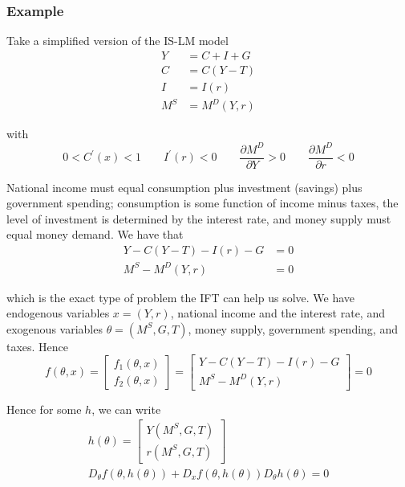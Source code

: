 \documentclass{article}
\begin{document}
\subsubsection{Example}
\label{ssub:example}

Take a simplified version of the IS-LM model
\begin{align*}
  Y   & = C + I + G   \\
  C   & = C(Y - T)    \\
  I   & = I(r)        \\
  M^S & = M^D(Y, r)
\end{align*}

with
\[
  0 < C^\prime(x) < 1
  \quad\quad
  I^\prime(r) < 0
  \quad\quad
  \dfrac{\partial M^D}{\partial Y} > 0
  \quad\quad
  \dfrac{\partial M^D}{\partial r} < 0
\]

National income must equal consumption plus investment (savings) plus government spending; consumption is some function of income minus taxes, the level of investment is determined by the interest rate, and money supply must equal money demand.  We have that
\begin{align*}
  Y - C(Y - T) - I(r) - G & = 0 \\
  M^S - M^D (Y, r)        & = 0
\end{align*}

which is the exact type of problem the IFT can help us solve. We have endogenous variables $x = (Y, r)$, national income and the interest rate, and exogenous variables $\theta = (M^S, G, T)$, money supply, government spending, and taxes. Hence
\begin{equation}
 \label{eq:is_lm_example} 
  f(\theta, x)
  =
  \left[\begin{matrix}
    f_1(\theta, x) \\
    f_2(\theta, x)
  \end{matrix}\right]
  =
  \left[\begin{matrix}
    Y - C(Y - T) - I(r) - G \\
    M^S - M^D (Y, r)
  \end{matrix}\right]
  = 0
\end{equation}

Hence for some $h$, we can write
\begin{equation}
  \begin{array}{c}
    h(\theta)
    = \left[\begin{matrix}
      Y(M^S, G, T) \\
      r(M^S, G, T)
    \end{matrix}\right] \\[6pt]
    D_\theta f(\theta, h(\theta)) + D_x f(\theta, h(\theta)) D_\theta h(\theta) = 0
  \end{array}
  \nonumber
\end{equation}
\end{document}
